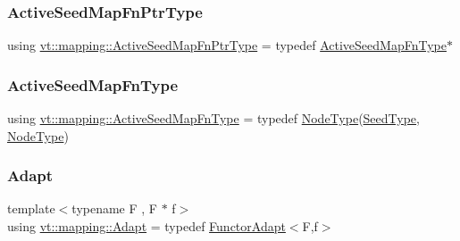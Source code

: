 \subsubsection{\texorpdfstring{Active\+Seed\+Map\+Fn\+Ptr\+Type}{ActiveSeedMapFnPtrType}}
{\footnotesize\ttfamily using \hyperlink{namespacevt_1_1mapping_a254b50d55be91c3bd002481b2e96da7e}{vt\+::mapping\+::\+Active\+Seed\+Map\+Fn\+Ptr\+Type} = typedef \hyperlink{namespacevt_1_1mapping_ab9cfcd87eb3ff00e63478d0197056b7e}{Active\+Seed\+Map\+Fn\+Type}$\ast$}

\mbox{\label{namespacevt_1_1mapping_ab9cfcd87eb3ff00e63478d0197056b7e}} 
\subsubsection{\texorpdfstring{Active\+Seed\+Map\+Fn\+Type}{ActiveSeedMapFnType}}
{\footnotesize\ttfamily using \hyperlink{namespacevt_1_1mapping_ab9cfcd87eb3ff00e63478d0197056b7e}{vt\+::mapping\+::\+Active\+Seed\+Map\+Fn\+Type} = typedef \hyperlink{namespacevt_a866da9d0efc19c0a1ce79e9e492f47e2}{Node\+Type}(\hyperlink{namespacevt_ae2e13198bdef4d5b8e603d6c1c7f0969}{Seed\+Type}, \hyperlink{namespacevt_a866da9d0efc19c0a1ce79e9e492f47e2}{Node\+Type})}

\mbox{\label{namespacevt_1_1mapping_ab3efa0ad45a85d80210d4acef3bb6c22}} 
\subsubsection{\texorpdfstring{Adapt}{Adapt}}
{\footnotesize\ttfamily template$<$typename F , F $\ast$ f$>$ \\
using \hyperlink{namespacevt_1_1mapping_ab3efa0ad45a85d80210d4acef3bb6c22}{vt\+::mapping\+::\+Adapt} = typedef \hyperlink{namespacevt_1_1mapping_a9502cb3a918b8389f64351638edab39f}{Functor\+Adapt}$<$F,f$>$}

\mbox{\label{namespacevt_1_1mapping_a2910ab582d95478603cdca7480af65b2}} 
